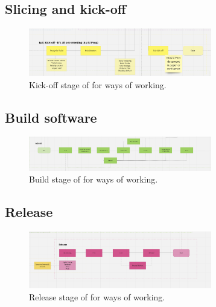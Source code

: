   \subsection{Slicing and kick-off}

  \begin{figure}[H]
    \centering
    \includegraphics[width=8cm]{assets/workflow/kickoff.png}
    \caption{Kick-off stage of for ways of working.}
    \label{fig:workflowKickOff}
  \end{figure}

  \subsection{Build software}

  \begin{figure}[H]
    \centering
    \includegraphics[width=8cm]{assets/workflow/build.png}
    \caption{Build stage of for ways of working.}
    \label{fig:workflowBuild}
  \end{figure}

  \subsection{Release}

  \begin{figure}[H]
    \centering
    \includegraphics[width=8cm]{assets/workflow/release.png}
    \caption{Release stage of for ways of working.}
    \label{fig:workRelease}
  \end{figure}

\newpage
